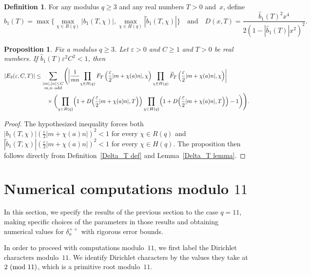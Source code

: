 \documentclass[11pt]{article}
\theoremstyle{plain}
\newtheorem{prop}[thm]{Proposition}
\theoremstyle{definition}
\newtheorem{definition}[thm]{Definition}
\numberwithin{equation}{section}
\renewcommand{\mod}[1]{{\ifmmode\text{\rm\ (mod~$#1$)}\else\discretionary{}{}{\hbox{\!\!}}\rm(mod~$#1$)\fi}}
\newcommand{\0}{{\vec 0}}
\begin{document}
\begin{definition}
For any modulus $q\ge3$ and any real numbers $T>0$ and~$x$, define
\[
\widehat{b}_1(T)=\max\biggl\{ \max\limits_{\chi\in R(q)} |b_1(T,\chi)|, \max\limits_{\chi\in H(q)} |\widetilde{b}_1(T,\chi)| \biggr\}
\quad\text{and}\quad
D(x,T)=\frac{\widehat{b}_1(T)^2x^4}{2(1-|\widehat{b}_1(T)|x^2)^2}.
\]
\end{definition}

\begin{prop} \label{E_3(varepsilon,C,T)}
Fix a modulus $q\ge3$. Let $\varepsilon>0$ and $C\ge1$ and $T>0$ be real numbers.
If $\widehat{b}_1(T) \varepsilon^2C^2<1$, then
\begin{align*}
|E_3(\varepsilon,C,T)| &\le \sum_{\substack{|m|,|n|\le C\\ m,n\ \text{odd}}} \Biggl( \biggl| \frac1{mn}{\prod_{\chi\in R(q)} F_T\left(\frac{\varepsilon}{2}|m+\chi(a)n|,\chi\right)\prod_{\chi\in H(q)} \widetilde{F}_T\left(\frac{\varepsilon}{2}|m+\chi(a)n|,\chi\right)} \biggr| \\
&\qquad{}\times \biggl(\prod_{\chi\in R(q)} \Bigl( 1+D\Bigl( \frac{\varepsilon}{2}|m+\chi(a)n|,T \Bigr) \Bigr) \prod_{\chi\in H(q)} \Bigl( 1+D\Bigl( \frac{\varepsilon}{2}|m+\chi(a)n|,T \Bigr) \Bigr) -1 \biggr) \Biggr).
\end{align*}
\end{prop}

\begin{proof}
The hypothesized inequality forces both $|b_1(T,\chi)|(\frac\varepsilon2|m+\chi(a)n|)^2<1$ for every $\chi\in R(q)$ and $|\widetilde{b}_1(T,\chi)|(\frac\varepsilon2|m+\chi(a)n|)^2<1$ for every $\chi\in H(q)$. The proposition then follows directly from Definition~\ref{Delta_T def} and Lemma~\ref{Delta_T lemma}.
\end{proof}


\section{Numerical computations modulo \texorpdfstring{$11$}{11}}\label{section numerics}

In this section, we specify the results of the previous section to the case $q=11$, making specific choices of the parameters in those results and obtaining numerical values for $\delta_a^{++}$ with rigorous error bounds.

In order to proceed with computations modulo~$11$, we first label the Dirichlet characters modulo~$11$. We identify Dirichlet characters by the values they take at $2\mod{11}$, which is a primitive root modulo~$11$.
\end{document}
